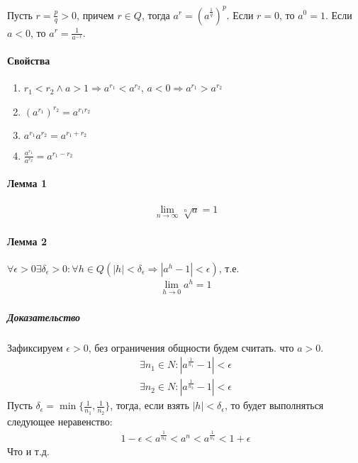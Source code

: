 \documentclass[10pt]{article}
\newcommand{\limninf}{\lim\limits_{n \to \infty}}
\begin{document}
		Пусть $r = \frac{p}{q} > 0$, причем $r \in Q$, тогда $a^r = (a^{\frac{1}{q}})^p$. Если $r = 0$, то $a^0 = 1$. Если $a < 0$, то $a^r = \frac{1}{a^{-r}}$.
		
		\paragraph{Свойства}
		\begin{enumerate}
			\item $r_1 < r_2 \wedge a > 1 \Rightarrow a^{r_1} < a^{r_2}$, $a < 0 \Rightarrow a^{r_1} > a^{r_2}$
			\item $(a^{r_1})^{r_2} = a^{r_1r_2}$
			\item $a^{r_1}a^{r_2} = a^{r_1 + r_2}$
			\item $\frac{a^{r_1}}{a^{r_2}} = a^{r_1 - r_2}$
		\end{enumerate}
		
		\paragraph{Лемма 1} 
		\begin{eqnarray}
			\limninf \sqrt[n]{a} = 1
		\end{eqnarray}
		
		\paragraph{Лемма 2}
		$\forall \epsilon > 0 \exists \delta_\epsilon > 0 : \forall h \in Q (|h| < \delta_\epsilon \Rightarrow |a^h - 1| < \epsilon)$, т.е. \begin{eqnarray}
			\lim\limits_{h\to 0} a^h = 1
		\end{eqnarray}
		\subparagraph{Доказательство}
		Зафиксируем $\epsilon > 0$, без ограничения общности будем считать. что $a > 0$.\\
		\begin{eqnarray}
			\nonumber \exists n_1 \in N : |a^\frac{1}{n_1} - 1| < \epsilon\\
			\nonumber \exists n_2 \in N : |a^\frac{1}{n_2} - 1| < \epsilon
		\end{eqnarray}
		Пусть $\delta_\epsilon = \min \{\frac{1}{n_1}, \frac{1}{n_2}\}$, тогда, если взять $|h| < \delta_\epsilon$, то будет выполняться следующее неравенство:
		\begin{eqnarray}
			\nonumber 1-\epsilon < a^\frac{1}{n_2} < a^{n} < a^\frac{1}{n_1} < 1+\epsilon
		\end{eqnarray} Что и т.д.
		
\end{document}
